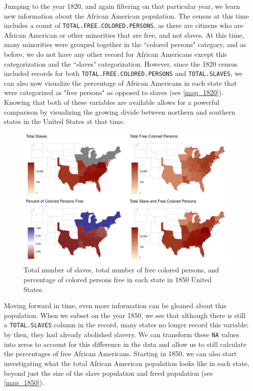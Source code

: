\documentclass[DIV=calc, paper=a4, fontsize=10pt, twocolumn]{scrartcl}\usepackage[]{graphicx}\usepackage[]{color}
\newenvironment{knitrout}{}{} %
\begin{document}
Jumping to the year 1820, and again filtering on that particular year, we learn new information about the African American population. The census at this time includes a count of \texttt{TOTAL.FREE.COLORED.PERSONS}, as there are citizens who are African American or other minorities that are free, and not slaves. At this time, many minorities were grouped together in the ``colored persons" category, and as before, we do not have any other record for African Americans except this categorization and the ``slaves" categorization. However, since the 1820 census included records for both \texttt{TOTAL.FREE.COLORED.PERSONS} and \texttt{TOTAL.SLAVES}, we can also now visualize the percentage of African Americans in each state that were categorized as "free persons" as opposed to slaves (see \autoref{map_1820}). Knowing that both of these variables are available allows for a powerful comparison by visualizing the growing divide between northern and southern states in the United States at that time.

\begin{knitrout}
\color{fgcolor}\begin{figure}[h]
\includegraphics[width=.5\textwidth]{figure/map_1850-1} \caption[Total number of slaves, total number of free colored persons, and percentage of colored persons free in each state in 1850 United States]{Total number of slaves, total number of free colored persons, and percentage of colored persons free in each state in 1850 United States.}\label{fig:map_1850}
\end{figure}


\end{knitrout}

Moving forward in time, even more information can be gleaned about this population. When we subset on the year 1850, we see that although there is still a \texttt{TOTAL.SLAVES} column in the record, many states no longer record this variable; by then, they had already abolished slavery. We can transform these \texttt{NA} values into zeros to account for this difference in the data and allow us to still calculate the percentages of free African Americans. Starting in 1850, we can also start investigating what the total African American population looks like in each state, beyond just the size of the slave population and freed population (see \autoref{map_1850}).
\end{document}
